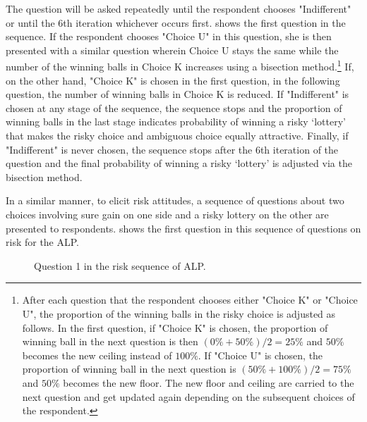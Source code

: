 \documentclass[]{article}
\begin{document}
The question will be asked repeatedly until the respondent chooses "Indifferent" or until the 6th iteration whichever occurs first.  shows the first question in the sequence. If the respondent chooses "Choice U" in this question, she is then presented with a similar question wherein Choice U stays the same while the number of the winning balls in Choice K increases using a bisection method.\footnote{After each question that the respondent chooses either "Choice K" or "Choice U", the proportion of the winning balls in the risky choice is adjusted as follows. In the first question, if "Choice K" is chosen, the proportion of winning ball in the next question is then $(0\% + 50\%)/2 = 25\%$ and $50\%$ becomes the new ceiling instead of $100\%$. If "Choice U" is chosen, the proportion of winning ball in the next question is $(50\% + 100\%)/2 = 75\%$ and $50\%$ becomes the new floor. The new floor and ceiling are carried to the next question and get updated again depending on the subsequent choices of the respondent.} If, on the other hand, "Choice K" is chosen in the first question, in the following question, the number of winning balls in Choice K is reduced. If "Indifferent" is chosen at any stage of the sequence, the sequence stops and the proportion of winning balls in the last stage indicates probability of winning a risky `lottery' that makes the risky choice and ambiguous choice equally attractive. Finally, if "Indifferent" is never chosen, the sequence stops after the 6th iteration of the question and the final probability of winning a risky `lottery' is adjusted via the bisection method. 

In a similar manner, to elicit risk attitudes, a sequence of questions about two choices involving sure gain on one side and a risky lottery on the other are presented to respondents.  shows the first question in this sequence of questions on risk for the ALP.

\begin{figure}[!htbp]
	\setlength{\fboxrule}{1.5pt}
	\setlength{\fboxsep}{0pt}
	\caption{Question 1 in the risk sequence of ALP.}
	\label{fig:2}
\end{figure} 
\end{document}
